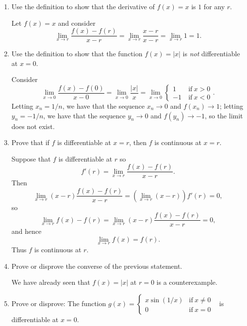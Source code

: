 \documentclass[12pt]{amsart}
\numberwithin{equation}{section}
\theoremstyle{plain} %
\theoremstyle{definition}
\theoremstyle{remark}
\begin{document}
\begin{enumerate}
 \item Use the definition to show that the derivative of $f(x) = x$ is $1$ for any $r$.
 
 
 
 \begin{framed}
Let $f(x)=x$ and consider
\[\lim_{x\to r} \frac{ f(x) - f(r) }{x - r} = \lim_{x\to r} \frac{x - r} {x - r} = \lim_{x \to r} 1 = 1.\]
 \end{framed}
 
 
 \item Use the definition to show that the function $f(x)=|x|$ is \emph{not} differentiable at $x=0$.
 
  \begin{framed}
Consider
\[\lim_{x\to 0} \frac{ f(x) - f(0) }{x - 0} = \lim_{x\to 0} \frac{|x|}{x} =  \lim_{x\to 0} \begin{cases} 1 & \ \text{if} \ x>0 \\ -1 & \ \text{if} \ x<0\end{cases}.\]
Letting $x_n= 1/n$, we have that the sequence $x_n\to 0$ and $f(x_n) \to 1$; letting $y_n= -1/n$, we have that the sequence $y_n\to 0$ and $f(y_n) \to -1$, so the limit does not exist.
 \end{framed}
 
 \item Prove that if $f$ is differentiable at $x=r$, then $f$ is continuous at $x=r$. 
 
   \begin{framed}
   Suppose that $f$ is differentiable at $r$ so
   \[ f'(r) = \lim_{x\to r} \frac{ f(x) - f(r) }{x - r}.\]
   Then 
   \[  \lim_{x\to r} (x-r) \frac{ f(x) - f(r) }{x - r} =  (\lim_{x\to r} (x-r)) f'(r) = 0,\]
 so
   \[ \lim_{x\to r} f(x) - f(r) = \lim_{x\to r} (x-r) \frac{ f(x) - f(r) }{x - r} = 0,\]
   and hence
   \[ \lim_{x \to r} f(x) = f(r).\]
   Thus $f$ is continuous at $r$.
   \end{framed}
 
 \item Prove or disprove the converse of the previous statement.
 
 \begin{framed}
We have already seen that $f(x) = |x|$ at $r=0$ is a counterexample.
\end{framed}




\item Prove or disprove: The function $g(x) = \begin{cases} x \sin(1/x) &\text{if} \ x \neq 0 \\ 0 & \text{if} \ x=0\end{cases}$ \  is differentiable at $x=0$.



\end{enumerate}
\end{document}
